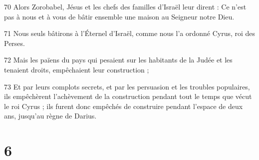 \par 70 Alors Zorobabel, Jésus et les chefs des familles d'Israël leur dirent : Ce n'est pas à nous et à vous de bâtir ensemble une maison au Seigneur notre Dieu.
\par 71 Nous seuls bâtirons à l'Éternel d'Israël, comme nous l'a ordonné Cyrus, roi des Perses.
\par 72 Mais les païens du pays qui pesaient sur les habitants de la Judée et les tenaient droits, empêchaient leur construction ;
\par 73 Et par leurs complots secrets, et par les persuasion et les troubles populaires, ils empêchèrent l'achèvement de la construction pendant tout le temps que vécut le roi Cyrus ; ils furent donc empêchés de construire pendant l'espace de deux ans, jusqu'au règne de Darius.

\chapter{6}

